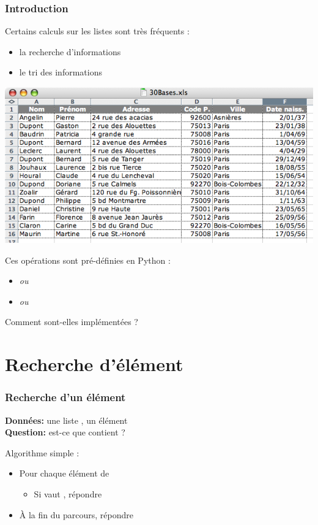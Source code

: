 \documentclass[12pt]{linfo-beamer}
\begin{document}
\begin{frame}
 \frametitle{Introduction}

 Certains calculs sur les listes sont très fréquents :
   \begin{itemize}
   \item la recherche d'informations
   \item le tri des informations
   \end{itemize}
   \begin{center}
     \includegraphics[scale=.32]{30Bases.png}
   \end{center}

 Ces opérations sont pré-définies en Python :
   \begin{itemize}
   \item {} \quad \emph{ou} \quad {}
   \item {} \quad \emph{ou} \quad {}
   \end{itemize}

 Comment sont-elles implémentées ?

\end{frame}


\section{Recherche d'élément}

\begin{frame}
  \frametitle{Recherche d'un élément}

  \begin{probleme}[recherche]\small
    \textbf{Données:} une liste , un élément \\
    \textbf{Question:} est-ce que  contient ? %
  \end{probleme}

  \pause
  \vfill

  Algorithme simple : 
  \begin{itemize}
  \item Pour chaque élément  de 
    \begin{itemize}
    \item Si  vaut , répondre 
    \end{itemize}
  \item À la fin du parcours, répondre 
  \end{itemize}


\end{frame}
\end{document}
